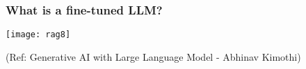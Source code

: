 







\begin{frame}[fragile]\frametitle{What is a fine-tuned LLM?}


		\begin{center}
		\texttt{[image: rag8]}
		\end{center}

{\tiny (Ref: Generative AI with Large Language Model - Abhinav  Kimothi)}

\end{frame}




